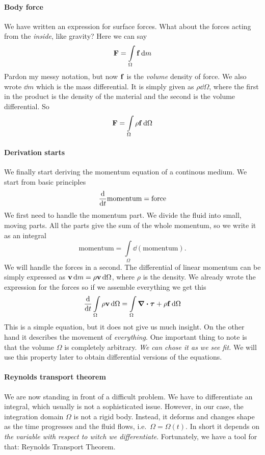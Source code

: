 \documentclass[a4paper]{article}
\begin{document}
\paragraph{Body force}
We have written an expression for surface forces. What about the forces
acting from the \emph{inside}, like gravity? Here we can say
\[
	\vb{F} = \int\limits_\Omega \vb{f} \dd{m}
\]
Pardon my messy notation, but now \(\vb{f}\) is the \emph{volume} density
of force. We also wrote \(\dd{m}\) which is the mass differential. It is
simply given as \(\rho\dd{\Omega}\), where the first in the product is the
density of the material and the second is the volume differential. So
\[
	\vb{F} = \int\limits_\Omega \rho\vb{f} \dd{\Omega}
\]

\paragraph{Derivation starts}
We finally start deriving the momentum equation of a continous medium.
We start from basic principles
\[
	\dv{t}\text{momentum} = {\text{force}}
\]
We first need to handle the momentum part. We divide the fluid into small,
moving parts. All the parts give the sum of the whole momentum, so we write
it as an integral
\[
	\text{momentum} = \int\limits_\Omega \dd{ (\text{momentum})}.
\]
We will handle the forces in a second. The differential of linear momentum
can be simply expressed as \(\vb{v}\dd{m} = \rho\vb{v} \dd{\Omega}\), where
\(\rho\) is the density. We already wrote the expression for the forces so
if we assemble everything we get this
\begin{equation}\label{eq::mom_part}
	\dv{t}\int\limits_\Omega \rho\vb{v} \dd{\Omega} =
	\int\limits_\Omega  \div\bm{\tau} + \rho\vb{f} \dd{\Omega}
\end{equation}
This is a simple equation, but it does not give us much insight. On the other
hand it describes the movement of \emph{everything}. One important thing to
note is that the volume \(\Omega\) is completely arbitrary. \emph{We can
	chose it as we see fit.} We will use this property later to obtain
differential versions of the equations.

\paragraph{Reynolds transport theorem}
We are now standing in front of a difficult problem. We have to
differentiate an integral, which usually is not a sophisticated
issue. However, in our case, the integration domain \(\Omega\)
is not a rigid body. Instead, it deforms and changes shape as the time progresses
and the fluid flows, i.e.\ \(\Omega = \Omega(t)\). In short it depends on
\emph{the variable with respect to witch we differentiate}.
Fortunately, we have a tool for that: Reynolds Transport Theorem.
\end{document}

